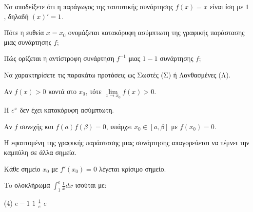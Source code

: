 \documentclass[11pt,a4paper]{article}
\newcommand{\kerkissans}[1]{{\fontfamily{maksf}\selectfont \textbf{#1}}}
\renewcommand{\textdexiakeraia}{}
\newcommand{\dint}{\displaystyle\int}
\newcommand\themanum{A}
\newcounter{thema}[section]
\renewcommand{\thethema}{\arabic{thema}}
\newcommand{\Thema}{\refstepcounter{thema}{\textbf{\textcolor{black}{\faPenSquare\ \  \large \kerkissans{\textbf{\thethemaο\hspace{2mm}Διαγώνισμα - Θέμα \themanum}}}}}\hspace{0mm}}{}
\newenvironment{thema}[1]
{\begin{tcolorbox}[title=\Thema\kerkissans{\textbf{\large{  #1}}},breakable,
enhanced standard,titlerule=0pt,toprule=0pt, rightrule=0pt, bottomrule=0pt,
colback=white,left=0mm,top=1mm,bottom=0mm,
boxrule=0pt,
colframe=white,leftrule=0mm,sharp corners,coltitle=black]
\renewcommand{\themanum}{#1}}
{\end{tcolorbox}}
\begin{document}
\begin{thema}{A}
\begin{erwthma}
    \item Να αποδείξετε ότι η παράγωγος της ταυτοτικής συνάρτησης $f(x) = x$ είναι ίση με $1$, δηλαδή $(x)' = 1$.
    \item Πότε η ευθεία $x=x_0$ ονομάζεται κατακόρυφη ασύμπτωτη της γραφικής παράστασης μιας συνάρτησης $f$;
    \item Πώς ορίζεται η αντίστροφη συνάρτηση $f^{-1}$ μιας $1-1$ συνάρτησης $f$;
    \item Να χαρακτηρίσετε τις παρακάτω προτάσεις ως Σωστές (Σ) ή Λανθασμένες (Λ).
    \begin{alist}
        \item Αν $f(x) > 0$ κοντά στο $x_0$, τότε $\lim\limits_{x\to x_0} f(x) > 0$.
        \item H $e^x$ δεν έχει κατακόρυφη ασύμπτωτη.
        \item Αν $f$ συνεχής και $f(a)f(\beta)=0$, υπάρχει $x_0 \in [a, \beta]$ με $f(x_0)=0$.
        \item Η εφαπτομένη της γραφικής παράστασης μιας συνάρτησης απαγορεύεται να τέμνει την καμπύλη σε άλλα σημεία.
        \item Κάθε σημείο $x_0$ με $f'(x_0)=0$ λέγεται κρίσιμο σημείο.
    \end{alist}
    \item Τo ολοκλήρωμα $\dint_1^e \frac{1}{x} dx$ ισούται με:
    \begin{tasks}[label=\let\textdexiakeraia\relax\alph*.](4)
        \task $e-1$
        \task $1$
        \task $\frac{1}{e}$
        \task $e$
    \end{tasks}
\end{erwthma}
\end{thema}
\vspace{1cm}
\end{document}
